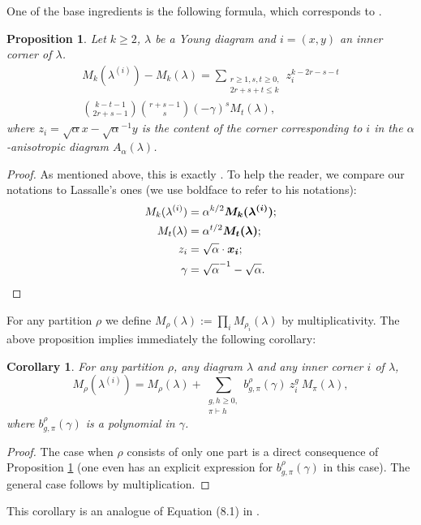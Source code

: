\documentclass[11pt]{amsart}
\theoremstyle{plain}
\newtheorem{corollary}[lemma]{Corollary}
\newtheorem{proposition}[lemma]{Proposition}
\theoremstyle{remark}
\begin{document}
One of the base ingredients is the following formula, which corresponds
to \cite[Proposition 8.3]{Lassalle2009}.
\begin{proposition}\label{PropMkLo}
    Let $k \geq 2$, $\lambda$ be a Young diagram and $i=(x,y)$ an inner corner of $\lambda$.
    \begin{multline*} M_k(\lambda^{(i)})-M_k(\lambda) =
        \sum_{\substack{r\geq 1, s,t \geq 0, \\ 2r+s+t \leq k}}
    z_i^{k-2r-s-t} \\
    \binom{k-t-1}{2r+s-1}\binom{r+s-1}{s}
    \left( -\gamma \right)^s M_t(\lambda),
\end{multline*}
    where $z_i=\sqrt{\alpha} x - \sqrt{\alpha}^{-1} y$ is the content of the 
    corner corresponding to $i$ in the $\alpha$-anisotropic diagram 
    $A_\alpha(\lambda)$.
\end{proposition}

\begin{proof}
    As mentioned above, this is exactly \cite[Proposition 8.3]{Lassalle2009}.
    To help the reader, we compare our notations to Lassalle's ones
    (we use boldface to refer to his notations):
    \begin{align*}
        M_k(\lambda^{(i)}) &= \alpha^{k/2} \bm{M_k(\lambda^{(i)})}; \\
        M_t(\lambda) &= \alpha^{t/2} \bm{M_t(\lambda)}; \\
        z_i &= \sqrt{\alpha} \cdot \bm{x_i};\\
        \gamma &= \sqrt{\alpha}^{-1} - \sqrt{\alpha}.\qedhere
    \end{align*}
\end{proof}

For any partition $\rho$ we define $M_\rho(\lambda):=\prod_i M_{\rho_i}(\lambda)$ by multiplicativity.
The above proposition implies immediately the following corollary:

\begin{corollary}\label{CorolMlo}
    For any partition $\rho$, any diagram $\lambda$ and any inner corner $i$ of $\lambda$,
    \[M_{\rho}(\lambda^{(i)}) = M_{\rho}(\lambda)
    + \sum_{\substack{ g,h \geq 0, \\ \pi \vdash h}} b_{g,\pi}^\rho(\gamma)
    \ z_i^g\ M_\pi(\lambda),\]
    where $b_{g,\pi}^\rho(\gamma)$ is a polynomial in $\gamma$.
\end{corollary}
\begin{proof}
    The case when $\rho$ consists of only one part is a direct consequence of Proposition \ref{PropMkLo} (one even has an explicit
    expression for $b_{g,\pi}^\rho(\gamma)$ in this case).
    The general case follows by multiplication.
\end{proof}
This corollary is an analogue of Equation (8.1) in \cite{Lassalle2009}.
\end{document}
